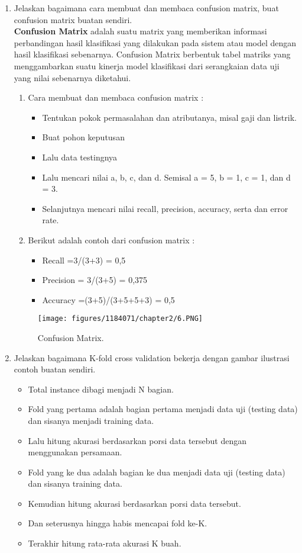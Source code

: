\begin{enumerate}
	\item Jelaskan bagaimana cara membuat dan membaca confusion matrix, buat confusion matrix buatan sendiri.
	\\ \textbf{Confusion Matrix} adalah suatu matrix yang memberikan informasi perbandingan hasil klasifikasi yang dilakukan pada sistem atau model dengan hasil klasifikasi sebenarnya. Confusion Matrix berbentuk tabel matriks yang menggambarkan suatu kinerja model klasifikasi dari serangkaian data uji yang nilai sebenarnya diketahui.
	\hfill\break
	\begin{enumerate}
	\item Cara membuat dan membaca confusion matrix :
	\begin{itemize}
	\item Tentukan pokok permasalahan dan atributanya, misal gaji dan listrik.
	\item Buat pohon keputusan
	\item Lalu data testingnya
	\item Lalu mencari nilai a, b, c, dan d. Semisal a = 5, b = 1, c = 1, dan d = 3.
	\item Selanjutnya mencari nilai recall, precision, accuracy, serta dan error rate.
	\end{itemize}
	\item Berikut adalah contoh dari confusion matrix :
	\begin{itemize}
	\item Recall =3/(3+3) = 0,5
	\item Precision = 3/(3+5) = 0,375
	\item Accuracy =(3+5)/(3+5+5+3) = 0,5
	\end{itemize}
	\end{enumerate}

	\begin{figure}[h]
	\centering
		\texttt{[image: figures/1184071/chapter2/6.PNG]}
		\caption{Confusion Matrix.}
	\end{figure}

	\item Jelaskan bagaimana K-fold cross validation bekerja dengan gambar ilustrasi contoh buatan sendiri.
	\hfill\break
	\begin{itemize}
	\item Total instance dibagi menjadi N bagian.
	\item Fold yang pertama adalah bagian pertama menjadi data uji (testing data) dan sisanya menjadi training data.
	\item Lalu hitung akurasi berdasarkan porsi data tersebut dengan menggunakan persamaan.
	\item Fold yang ke dua adalah bagian ke dua menjadi data uji (testing data) dan sisanya training data. 
	\item Kemudian hitung akurasi berdasarkan porsi data tersebut.
	\item Dan seterusnya hingga habis mencapai fold ke-K.
	\item Terakhir hitung rata-rata akurasi K buah.
	\end{itemize}


\end{enumerate}
